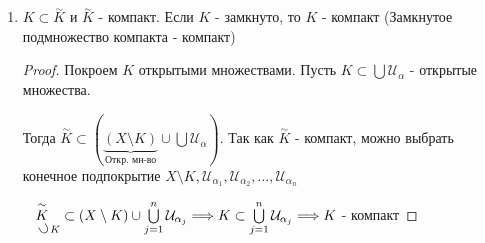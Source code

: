 \begin{theorem-non}
\begin{enumerate}
\begin{proof}
            Теперь проверим ограниченность. Возьмем $a \in X$. Тогда $K \subset \bigcup\limits_{n = 1}^{\infty} B_n(a)$.
            Если $x \in K$, то расстрояние между $x$ и $a$ будет конечным, а значит есть такой натуральный номер, который больше, 
            чем это расстояние $\Longrightarrow x \in B_n(a)$. Так как $K$ - компакт, можно выбрать конечное подпокрытие 
            $B_1(a), \dots, B_n(a) \qquad K \subset \bigcup\limits_{j = 1}^{n} B_j(a) = B_n(a) \Longrightarrow K$ содержится в каком то шаре $\Longrightarrow K$ - ограниченное множество 
        \end{proof}
        \item $K \subset \overset{\mathtt{\sim}}{K}$ и $\overset{\mathtt{\sim}}{K}$ - компакт. Если $K$ - замкнуто, то $K$ - компакт
        (Замкнутое подмножество компакта - компакт)
        \begin{proof} \quad

            Покроем $K$ открытыми множествами. Пусть $K \subset \bigcup \mathcal{U}_{\alpha}$ - открытые множества. 
            
            Тогда $\overset{\mathtt{\sim}}{K} \subset (\underbrace{(X \setminus K)}_{\text{Откр. мн-во}} \cup \bigcup \mathcal{U}_{\alpha})$.
            Так как $\overset{\mathtt{\sim}}{K}$ - компакт, можно выбрать конечное подпокрытие $X \setminus K, \mathcal{U}_{\alpha_1}, \mathcal{U}_{\alpha_2}, \dots, \mathcal{U}_{\alpha_n}$

            $\underset{\quad \rotatebox[origin=c]{120}{$ \subset $} K}{\overset{\mathtt{\sim}}{K}} \subset (X \setminus K) \cup \bigcup\limits_{j = 1}^{n} \mathcal{U}_{\alpha_j} \Longrightarrow K \subset \bigcup\limits_{j = 1}^{n} \mathcal{U}_{\alpha_j} \Longrightarrow K$ - компакт
            
        \end{proof}
    \end{enumerate}
\end{theorem-non}

